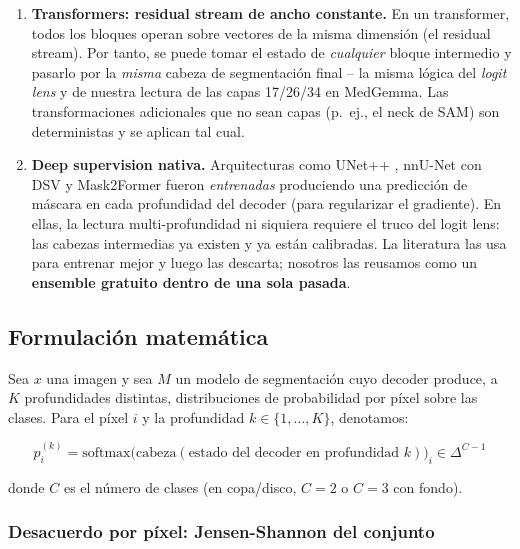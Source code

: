 \documentclass[12pt,a4paper]{article}
\begin{document}
\begin{enumerate}
    \item \textbf{Transformers: residual stream de ancho constante.}
    En un transformer, todos los bloques operan sobre vectores de la misma dimensión (el residual stream).
    Por tanto, se puede tomar el estado de \emph{cualquier} bloque intermedio y pasarlo por la \emph{misma} cabeza de segmentación final -- la misma lógica del \textit{logit lens} \citep{belrose2023tunedlens} y de nuestra lectura de las capas 17/26/34 en MedGemma.
    Las transformaciones adicionales que no sean capas (p.~ej., el neck de SAM) son deterministas y se aplican tal cual.

    \item \textbf{Deep supervision nativa.}
    Arquitecturas como UNet++ \citep{zhou2020unetpp}, nnU-Net con DSV \citep{isensee2021nnunet} y Mask2Former \citep{cheng2022mask2former} fueron \emph{entrenadas} produciendo una predicción de máscara en cada profundidad del decoder (para regularizar el gradiente).
    En ellas, la lectura multi-profundidad ni siquiera requiere el truco del logit lens: las cabezas intermedias ya existen y ya están calibradas.
    La literatura las usa para entrenar mejor y luego las descarta; nosotros las reusamos como un \textbf{ensemble gratuito dentro de una sola pasada}.
\end{enumerate}

\subsection{Formulación matemática}

Sea $x$ una imagen y sea $M$ un modelo de segmentación cuyo decoder produce, a $K$ profundidades distintas, distribuciones de probabilidad por píxel sobre las clases.
Para el píxel $i$ y la profundidad $k \in \{1, \dots, K\}$, denotamos:

\begin{equation}
p_i^{(k)} = \text{softmax}\big(\text{cabeza}(\text{estado del decoder en profundidad } k)\big)_i \in \Delta^{C-1}
\end{equation}

donde $C$ es el número de clases (en copa/disco, $C = 2$ o $C = 3$ con fondo).

\subsubsection{Desacuerdo por píxel: Jensen-Shannon del conjunto}
\end{document}
